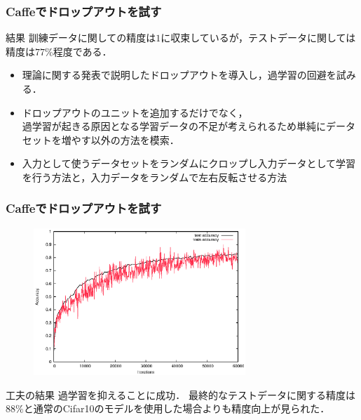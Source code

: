 \documentclass[dvipdfmx,11pt,notheorems]{beamer}
\theoremstyle{definition}
\begin{document}
\begin{frame}[fragile]\frametitle{Caffeでドロップアウトを試す}
\begin{alertblock}{結果}
訓練データに関しての精度は$1$に収束しているが，テストデータに関しては精度は$77\%$程度である．
\end{alertblock}
\begin{itemize}
  \item 理論に関する発表で説明したドロップアウトを導入し，過学習の回避を試みる．
  \item ドロップアウトのユニットを追加するだけでなく，\\過学習が起きる原因となる学習データの不足が考えられるため単純にデータセットを増やす以外の方法を模索．
  \item 入力として使うデータセットをランダムにクロップし入力データとして学習を行う方法と，入力データをランダムで左右反転させる方法
\end{itemize}
\end{frame}

\begin{frame}[fragile]\frametitle{Caffeでドロップアウトを試す}
\begin{figure}[tb]
  \begin{center}
    \includegraphics[clip,width=8cm]{./fig/eps/dropout.eps}
  \end{center}
\end{figure}
\begin{block}{工夫の結果}
過学習を抑えることに成功．
最終的なテストデータに関する精度は$88\%$と通常のCifar10のモデルを使用した場合よりも精度向上が見られた．
\end{block}
\end{frame}
\end{document}
